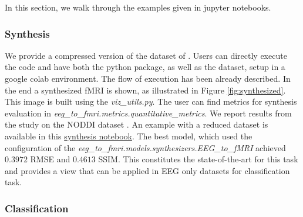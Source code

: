 In this section, we walk through the examples given in jupyter notebooks.

\subsubsection{Synthesis}\label{section:synthesis}


We provide a compressed version of the dataset of \cite{dataset2014noddi}. Users can directly execute the code and have both the python package, as well as the dataset, setup in a google colab environment. The flow of execution has been already described. In the end a synthesized fMRI is shown, as illustrated in Figure \ref{fig:synthesized}. This image is built using the \textit{viz\_utils.py}. The user can find metrics for synthesis evaluation in \textit{eeg\_to\_fmri.metrics.quantitative\_metrics}. We report results from the \cite{calhas2022eeg} study on the NODDI dataset \cite{dataset2014noddi}. An example with a reduced dataset is available in this \href{https://github.com/eeg-to-fmri/eeg-to-fmri/blob/main/examples/synthesis.ipynb}{synthesis notebook}. The best model, which used the configuration of the \textit{eeg\_to\_fmri.models.synthesizers.EEG\_to\_fMRI} achieved $0.3972$  RMSE and $0.4613$ SSIM. This constitutes the state-of-the-art for this task and provides a view that can be applied in EEG only datasets for classification task.

\subsubsection{Classification}\label{section:classification}

